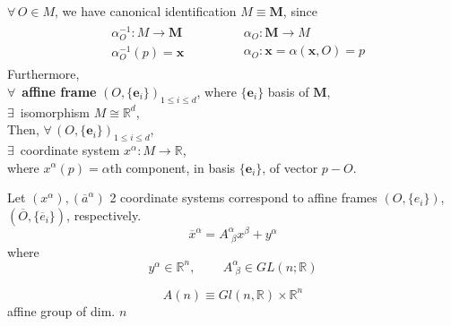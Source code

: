 \begin{proposition}
	$\forall \, O \in M$, we have canonical identification $M \equiv \mathbf{M}$, since
	\[
	\begin{gathered}
	\begin{aligned}
	& \alpha^{-1}_O:M \to \mathbf{M} \\
	& \alpha^{-1}_O(p) = \mathbf{x} 
	\end{aligned} \qquad \quad \, 
	\begin{aligned}
	& \alpha_O : \mathbf{M} \to M \\
	& \alpha_O: \mathbf{x} = \alpha(\mathbf{x}, O) = p
	\end{aligned}
	\end{gathered}
	\]
	Furthermore, \\
	$\forall \, $ \textbf{affine frame} $(O, \lbrace \mathbf{e}_i \rbrace)_{1\leq i \leq d}$, where $\lbrace \mathbf{e}_i \rbrace$ basis of $\mathbf{M}$, \\
	\phantom{Furthermore} $\exists \, $ isomorphism $M \cong \mathbb{R}^d$, \\
	Then, $\forall \, (O, \lbrace \mathbf{e}_i \rbrace)_{1 \leq i \leq d}$, \\
	\phantom{Then} $\exists \, $ coordinate system $x^{\alpha} : M \to \mathbb{R}$, \\
	\phantom{Then $\exists \, $} where $x^{\alpha}(p) = \alpha$th component, in basis $\lbrace \mathbf{e}_i \rbrace$, of vector $p - O$. 
	
	
	
\end{proposition}

\begin{theorem}
  Let $(x^{\alpha}), (\overline{a}^{\alpha})$ 2 coordinate systems correspond to affine frames $(O, \lbrace e_i \rbrace)$, $( \overline{O}, \lbrace \overline{e}_i \rbrace )$, respectively.
\begin{equation}
  \overline{x}^{\alpha} = A^{\alpha}_{ \, \, \beta} x^{\beta} + y^{\alpha}
\end{equation}
where
\[
y^{\alpha} \in \mathbb{R}^n, \qquad \, A^{\alpha}_{ \, \, \beta} \in GL(n; \mathbb{R})
\]
\end{theorem}

\begin{definition}
  \begin{equation}
    A(n) \equiv Gl(n,\mathbb{R}) \times \mathbb{R}^n
  \end{equation}
  affine group of dim. $n$
  \end{definition}

